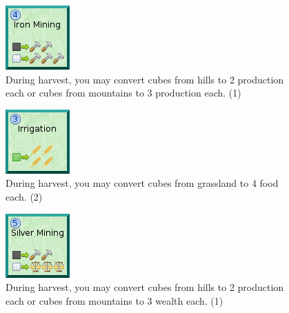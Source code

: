 \documentclass[11pt,a4paper,titlepage]{article}
\begin{document}
{{  \begin{figure}[!htb]
    \begin{minipage}[c]{0.1\textwidth}
      \includegraphics[scale=.7]{doe_tech_iron_mining.png}
    \end{minipage}\hfill
    \begin{minipage}[c]{0.6\textwidth}
      \captionsetup{labelformat=empty, justification=justified, singlelinecheck=false}
      \caption{During harvest, you may convert cubes from hills to 2 production each or cubes from mountains to 3 production each. (1)}
    \end{minipage}\hfill
    \label{fig:tech_iron_mining}
  \end{figure}

  \begin{figure}[!htb]
    \begin{minipage}[c]{0.1\textwidth}
      \includegraphics[scale=.7]{doe_tech_irrigation.png}
    \end{minipage}\hfill
    \begin{minipage}[c]{0.6\textwidth}
      \captionsetup{labelformat=empty, justification=justified, singlelinecheck=false}
      \caption{During harvest, you may convert cubes from grassland to 4 food each. (2)}
    \end{minipage}\hfill
    \label{fig:tech_irrigation}
  \end{figure}

  \begin{figure}[!htb]
    \begin{minipage}[c]{0.1\textwidth}
      \includegraphics[scale=.7]{doe_tech_silver_mining.png}
    \end{minipage}\hfill
    \begin{minipage}[c]{0.6\textwidth}
      \captionsetup{labelformat=empty, justification=justified, singlelinecheck=false}
      \caption{During harvest, you may convert cubes from hills to 2 production each or cubes from mountains to 3 wealth each. (1)}
    \end{minipage}\hfill
    \label{fig:tech_silver_mining}
  \end{figure}

}}
\end{document}
